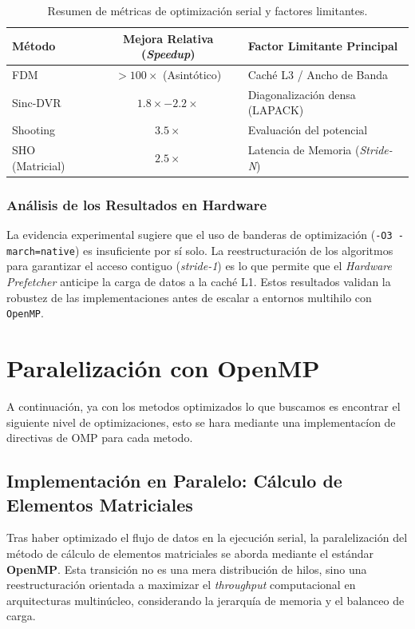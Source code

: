 \documentclass[11pt,fleqn]{article}
\begin{document}
\begin{table}[H]
\centering
\caption{Resumen de métricas de optimización serial y factores limitantes.}
\label{tab:resumen_opt}
\begin{tabular}{lcl}
\toprule
\textbf{Método} & \textbf{Mejora Relativa (\textit{Speedup})} & \textbf{Factor Limitante Principal} \\ \midrule
FDM             & $> 100\times$ (Asintótico)         & Caché L3 / Ancho de Banda           \\
Sinc-DVR        & $1.8\times - 2.2\times$            & Diagonalización densa (LAPACK)      \\
Shooting        & $3.5\times$                        & Evaluación del potencial            \\ 
SHO (Matricial) & $2.5\times$                        & Latencia de Memoria (\textit{Stride-N}) \\ \bottomrule
\end{tabular}
\end{table}

\subsubsection{Análisis de los Resultados en Hardware}
La evidencia experimental sugiere que el uso de banderas de optimización (\texttt{-O3 -march=native}) es insuficiente por sí solo. La reestructuración de los algoritmos para garantizar el acceso contiguo (\textit{stride-1}) es lo que permite que el \textit{Hardware Prefetcher} anticipe la carga de datos a la caché L1. Estos resultados validan la robustez de las implementaciones antes de escalar a entornos multihilo con \texttt{OpenMP}.




\section{Paralelización con OpenMP}

A continuación, ya con los metodos optimizados lo que buscamos es encontrar el siguiente nivel de optimizaciones, esto se hara mediante una implementacíon de directivas de OMP para cada metodo. 


\subsection{Implementación en Paralelo: Cálculo de Elementos Matriciales}

Tras haber optimizado el flujo de datos en la ejecución serial, la paralelización del método de cálculo de elementos matriciales se aborda mediante el estándar \textbf{OpenMP}. Esta transición no es una mera distribución de hilos, sino una reestructuración orientada a maximizar el \textit{throughput} computacional en arquitecturas multinúcleo, considerando la jerarquía de memoria y el balanceo de carga.
\end{document}
